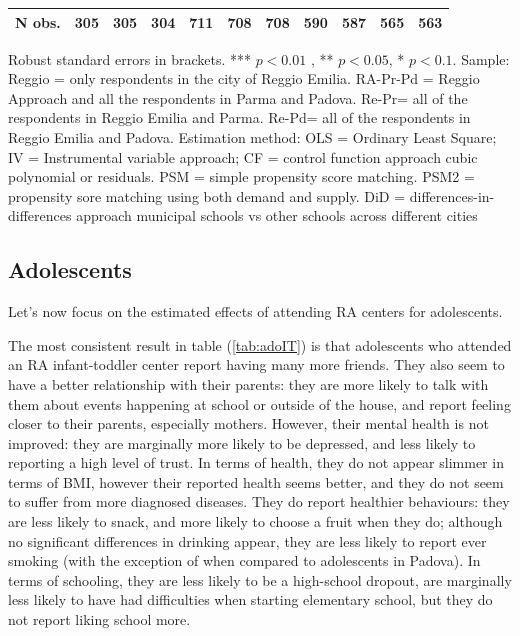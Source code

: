\documentclass[12pt]{article}
\begin{document}
\begin{table}[ht]
\begin{center}
\begin{adjustbox}{width=1.2\textwidth,center=\textwidth}
\begin{tabular}{l*{10}{c}}
\hline
N obs. &  305 & 305 & 304 & 711 & 708 & 708 & 590 & 587 & 565 & 563 \\
\hline
\end{tabular}
\end{adjustbox}
\end{center}
\par
\vspace{1ex}
\par
{\footnotesize \raggedright{Robust standard errors in brackets. *** $p<0.01$%
, ** $p<0.05$, * $p<0.1$. Sample: Reggio = only respondents in the city of
Reggio Emilia. RA-Pr-Pd = Reggio Approach and all the respondents in Parma
and Padova. Re-Pr= all of the respondents in Reggio Emilia and Parma. Re-Pd=
all of the respondents in Reggio Emilia and Padova. Estimation method: OLS =
Ordinary Least Square; IV = Instrumental variable approach; CF = control
function approach cubic polynomial or residuals. PSM = simple propensity
score matching. PSM2 = propensity sore matching using both demand and
supply. DiD = differences-in-differences approach municipal schools vs other
schools across different cities} }
\end{table}

\subsection{Adolescents}

Let's now focus on the estimated effects of attending RA centers for
adolescents.

The most consistent result in table (\ref{tab:adoIT}) is that adolescents
who attended an RA infant-toddler center report having many more friends.
They also seem to have a better relationship with their parents: they are
more likely to talk with them about events happening at school or outside of
the house, and report feeling closer to their parents, especially mothers.
However, their mental health is not improved: they are marginally more
likely to be depressed, and less likely to reporting a high level of trust.
In terms of health, they do not appear slimmer in terms of BMI, however
their reported health seems better, and they do not seem to suffer from more
diagnosed diseases. They do report healthier behaviours: they are less
likely to snack, and more likely to choose a fruit when they do; although no
significant differences in drinking appear, they are less likely to report
ever smoking (with the exception of when compared to adolescents in Padova).
In terms of schooling, they are less likely to be a high-school dropout, are
marginally less likely to have had difficulties when starting elementary
school, but they do not report liking school more.
\end{document}
